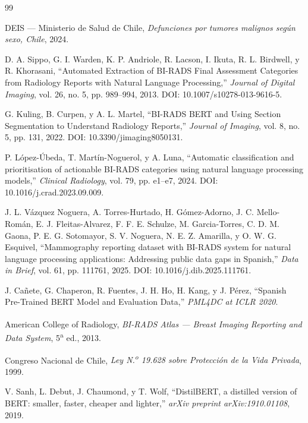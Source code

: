 \documentclass[10pt,journal,a4paper]{IEEEtran}
\begin{document}
\begin{thebibliography}{99}

DEIS --- Ministerio de Salud de Chile,
\emph{Defunciones por tumores malignos seg\'un sexo, Chile}, 2024.

D. A. Sippo, G. I. Warden, K. P. Andriole, R. Lacson, I. Ikuta, R. L. Birdwell, y R. Khorasani,
``Automated Extraction of BI-RADS Final Assessment Categories from Radiology Reports with Natural Language Processing,''
\emph{Journal of Digital Imaging}, vol. 26, no. 5, pp. 989--994, 2013.
DOI: 10.1007/s10278-013-9616-5.

G. Kuling, B. Curpen, y A. L. Martel,
``BI-RADS BERT and Using Section Segmentation to Understand Radiology Reports,''
\emph{Journal of Imaging}, vol. 8, no. 5, pp. 131, 2022.
DOI: 10.3390/jimaging8050131.

P. L\'opez-\'Ubeda, T. Mart\'in-Noguerol, y A. Luna,
``Automatic classification and prioritisation of actionable BI-RADS categories using natural language processing models,''
\emph{Clinical Radiology}, vol. 79, pp. e1--e7, 2024.
DOI: 10.1016/j.crad.2023.09.009.

J. L. V\'azquez Noguera, A. Torres-Hurtado, H. G\'omez-Adorno, J. C. Mello-Rom\'an, E. J. Fleitas-Alvarez, F. F. E. Schulze, M. Garcia-Torres, C. D. M. Gaona, P. E. G. Sotomayor, S. V. Noguera, N. E. Z. Amarilla, y O. W. G. Esquivel,
``Mammography reporting dataset with BI-RADS system for natural language processing applications: Addressing public data gaps in Spanish,''
\emph{Data in Brief}, vol. 61, pp. 111761, 2025.
DOI: 10.1016/j.dib.2025.111761.

J. Ca\~nete, G. Chaperon, R. Fuentes, J. H. Ho, H. Kang, y J. P\'erez,
``Spanish Pre-Trained BERT Model and Evaluation Data,''
\emph{PML4DC at ICLR 2020}.

American College of Radiology,
\emph{BI-RADS\textsuperscript{\textregistered} Atlas --- Breast Imaging Reporting and Data System},
5\textsuperscript{a} ed., 2013.

Congreso Nacional de Chile,
\emph{Ley N.\textsuperscript{o} 19.628 sobre Protecci\'on de la Vida Privada},
1999.

V. Sanh, L. Debut, J. Chaumond, y T. Wolf,
``DistilBERT, a distilled version of BERT: smaller, faster, cheaper and lighter,''
\emph{arXiv preprint arXiv:1910.01108}, 2019.

\end{thebibliography}
\end{document}
